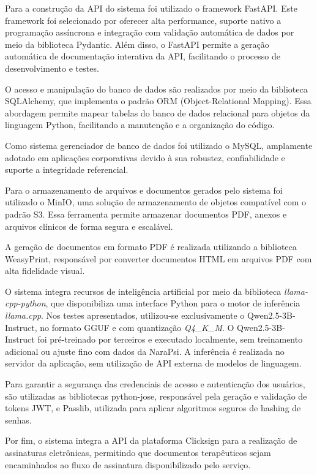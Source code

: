 Para a construção da API do sistema foi utilizado o framework FastAPI. Este framework foi selecionado por oferecer alta performance, suporte nativo a programação assíncrona e integração com validação automática de dados por meio da biblioteca Pydantic. Além disso, o FastAPI permite a geração automática de documentação interativa da API, facilitando o processo de desenvolvimento e testes.

O acesso e manipulação do banco de dados são realizados por meio da biblioteca SQLAlchemy, que implementa o padrão ORM (Object-Relational Mapping). Essa abordagem permite mapear tabelas do banco de dados relacional para objetos da linguagem Python, facilitando a manutenção e a organização do código.

Como sistema gerenciador de banco de dados foi utilizado o MySQL, amplamente adotado em aplicações corporativas devido à sua robustez, confiabilidade e suporte a integridade referencial.

Para o armazenamento de arquivos e documentos gerados pelo sistema foi utilizado o MinIO, uma solução de armazenamento de objetos compatível com o padrão S3. Essa ferramenta permite armazenar documentos PDF, anexos e arquivos clínicos de forma segura e escalável.

A geração de documentos em formato PDF é realizada utilizando a biblioteca WeasyPrint, responsável por converter documentos HTML em arquivos PDF com alta fidelidade visual.

O sistema integra recursos de inteligência artificial por meio da biblioteca \textit{llama-cpp-python}, que disponibiliza uma interface Python para o motor de inferência \textit{llama.cpp}. Nos testes apresentados, utilizou-se exclusivamente o Qwen2.5-3B-Instruct, no formato GGUF e com quantização \textit{Q4\_K\_M}. O Qwen2.5-3B-Instruct foi pré-treinado por terceiros e executado localmente, sem treinamento adicional ou ajuste fino com dados da NaraPsi. A inferência é realizada no servidor da aplicação, sem utilização de API externa de modelos de linguagem.

Para garantir a segurança das credenciais de acesso e autenticação dos usuários, são utilizadas as bibliotecas python-jose, responsável pela geração e validação de tokens JWT, e Passlib, utilizada para aplicar algoritmos seguros de hashing de senhas.

Por fim, o sistema integra a API da plataforma Clicksign para a realização de assinaturas eletrônicas, permitindo que documentos terapêuticos sejam encaminhados ao fluxo de assinatura disponibilizado pelo serviço.

